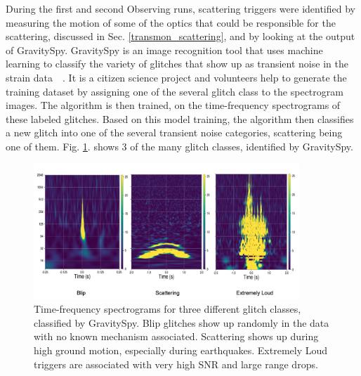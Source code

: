 \documentclass[12pt]{iopart}
\begin{document}


During the first and second Observing runs, scattering triggers were identified by measuring the motion of some of the optics that could be responsible for the scattering, discussed in Sec. \ref{transmon_scattering}, and by looking at the output of GravitySpy.
GravitySpy is an image recognition tool that uses machine learning to classify the variety of glitches that show up as transient noise in the strain data~\cite{gspy}~\cite{gspymachine}. It is a citizen science project and volunteers help to generate the training dataset by assigning one of the several glitch class to the spectrogram images. The algorithm is then trained, on the time-frequency spectrograms of these labeled glitches. Based on this model training, the algorithm then classifies a new glitch into one of the several transient noise categories, scattering being one of them. Fig. \ref{fig:gspyimages}. shows 3 of the many glitch classes, identified by GravitySpy.

\begin{figure}[h]
    \centering
    \includegraphics[width=10cm]{gspyglitch1.png}
    \caption{Time-frequency spectrograms for three different glitch classes, classified by GravitySpy. Blip glitches show up randomly in the data with no known mechanism associated. Scattering shows up during high ground motion, especially during earthquakes. Extremely Loud triggers are associated with very high SNR and large range drops. }
    \label{fig:gspyimages}
\end{figure}
\end{document}
